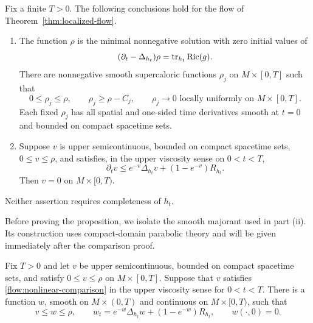 \begin{proposition}\label{prop:scalar-comparison}
Fix a finite $T>0$.  The following conclusions hold for the flow of
Theorem~\ref{thm:localized-flow}.
\begin{enumerate}[label=\textup{(\roman*)}]
\item The function $\rho$ is the minimal nonnegative solution with
      zero initial values of
      \begin{equation}\label{flow:rho-source}
      (\partial_t-\Delta_{h_t})\rho
                        =\operatorname{tr}_{h_t}\operatorname{Ric}(g).
      \end{equation}
      There are nonnegative smooth supercaloric functions $\rho_j$ on
      $M\times[0,T]$ such that
      \begin{equation}\label{flow:rho-tails}
      0\le\rho_j\le\rho,\qquad
      \rho_j\ge\rho-C_j,\qquad
      \rho_j\longrightarrow0
      \text{ locally uniformly on }M\times[0,T].
      \end{equation}
      Each fixed $\rho_j$ has all spatial and one-sided time
      derivatives smooth at $t=0$ and bounded on compact spacetime
      sets.
\item Suppose $v$ is upper semicontinuous, bounded on compact
      spacetime sets, $0\le v\le\rho$, and satisfies, in the upper
      viscosity sense on $0<t<T$,
      \begin{equation}\label{flow:nonlinear-comparison}
      \partial_tv\le e^{-v}\Delta_{h_t}v+(1-e^{-v})R_{h_t}.
      \end{equation}
      Then $v=0$ on $M\times[0,T)$.
\end{enumerate}
Neither assertion requires completeness of $h_t$.
\end{proposition}

Before proving the proposition, we isolate the smooth majorant used
in part \textup{(ii)}.  Its construction uses compact-domain parabolic
theory and will be given immediately after the comparison proof.

\begin{lemma}\label{lem:scalar-majorant}
Fix $T>0$ and let $v$ be upper semicontinuous, bounded on compact
spacetime sets, and satisfy $0\le v\le\rho$ on $M\times[0,T]$.
Suppose that $v$ satisfies \eqref{flow:nonlinear-comparison} in the
upper viscosity sense for $0<t<T$.  There is a function $w$, smooth
on $M\times(0,T)$ and continuous on $M\times[0,T)$, such that
\[
 v\le w\le\rho,\qquad
 w_t=e^{-w}\Delta_{h_t}w+(1-e^{-w})R_{h_t},\qquad
 w(\cdot,0)=0.
\]
\end{lemma}

